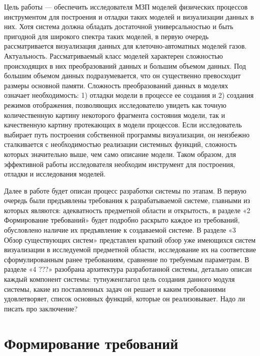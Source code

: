 \documentclass[a4paper,12pt]{extarticle}
\let\stdsection\section
\renewcommand\section{\newpage\stdsection}
\begin{document}
Цель работы — обеспечить исследователя МЗП моделей физических процессов инструментом для построения и отладки таких моделей и визуализации данных в них. Хотя система должна обладать достаточной универсальностью и быть пригодной для широкого спектра таких моделей, в первую очередь рассматривается визуализация данных для клеточно-автоматных моделей газов. 
Актуальность. Рассматриваемый класс моделей характерен сложностью происходящих в них преобразований данных и большим объемом данных. Под большим объемом данных подразумевается, что он существенно превосходит размеры основной памяти. Сложность преобразований данных в моделях означает необходимость: 1) отладки модели в процессе ее создания и 2) создания режимов отображения, позволяющих исследователю увидеть как точную количественную картину некоторого фрагмента состояния модели, так и качественную картину протекающих в модели процессов. Если исследователь выбирает путь построения собственной программы визуализации, он неизбежно сталкивается с необходимостью реализации системных функций, сложность которых значительно выше, чем само описание модели.  Таком образом, для эффективной работы исследователя необходим инструмент для построения, отладки и исследования моделей.







Далее в работе будет описан процесс разработки системы по этапам. В первую очередь были предъявлены требования к разрабатываемой системе, главными из которых являются: адекватность предметной области и открытость, в разделе «2 Формирование требований» будет подробно раскрыто каждое из требований, обусловлено наличие их предъявление к создаваемой системе. В разделе «3 Обзор существующих систем» представлен краткий обзор уже имеющихся систем визуализации в исследуемой предметной области, исследование их на соответсвие сформулированным ранее требованиям, сравнение по требуемым параметрам. В разделе «4 ???» разобрана архитектура разработанной системы, детально описан каждый компонент системы: тутнуженглагол цель создания данного модуля системы, какие из поставленных задач он решает и каким требованиями удовлетворяет, список основных функций, которые он реализовывает. Надо ли писать про заключение?




\section{Формирование требований}
\end{document}
